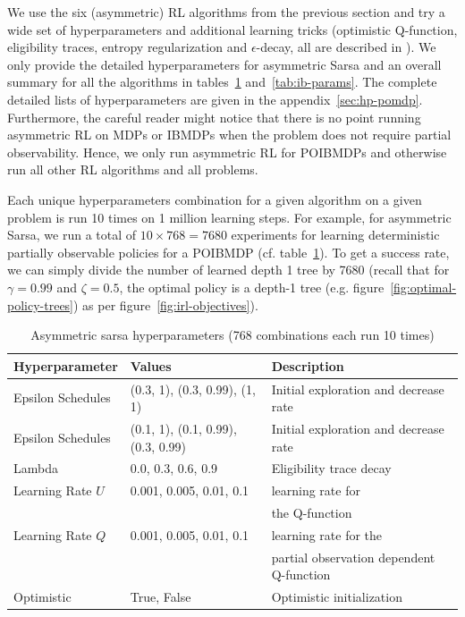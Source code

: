 We use the six (asymmetric) RL algorithms from the previous section and try a wide set of hyperparameters and additional learning tricks (optimistic Q-function, eligibility traces, entropy regularization and $\epsilon$-decay, all are described in \cite{sutton}).
We only provide the detailed hyperparameters for asymmetric Sarsa and an overall summary for all the algorithms in tables~\ref{tab:hp-sarsa} and~\ref{tab:ib-params}.
The complete detailed lists of hyperparameters are given in the appendix~\ref{sec:hp-pomdp}.
Furthermore, the careful reader might notice that there is no point running asymmetric RL on MDPs or IBMDPs when the problem does not require partial observability.
Hence, we only run asymmetric RL for POIBMDPs and otherwise run all other RL algorithms and all problems.

Each unique hyperparameters combination for a given algorithm on a given problem is run 10 times on 1 million learning steps.
For example, for asymmetric Sarsa, we run a total of $10\times 768= 7680$ experiments for learning deterministic partially observable policies for a POIBMDP (cf. table~\ref{tab:hp-sarsa}).
To get a success rate, we can simply divide the number of learned depth 1 tree by 7680 (recall that for $\gamma=0.99$ and $\zeta=0.5$, the optimal policy is a depth-1 tree (e.g. figure~\ref{fig:optimal-policy-trees}) as per figure~\ref{fig:irl-objectives}). 

\begin{table}
\centering
\small
\caption{Asymmetric sarsa hyperparameters (768 combinations each run 10 times)}\label{tab:hp-sarsa}
\begin{tabular}{lll}
\toprule
\textbf{Hyperparameter} & \textbf{Values} & \textbf{Description} \\
\midrule
Epsilon Schedules & (0.3, 1), (0.3, 0.99), (1, 1) & Initial exploration and decrease rate \\
Epsilon Schedules & (0.1, 1), (0.1, 0.99), (0.3, 0.99) & Initial exploration and decrease rate \\
Lambda & 0.0, 0.3, 0.6, 0.9 & Eligibility trace decay \\
Learning Rate $U$ & 0.001, 0.005, 0.01, 0.1 & learning rate for \\
 & & the Q-function \\
Learning Rate $Q$ & 0.001, 0.005, 0.01, 0.1 & learning rate for the \\
 & & partial observation dependent Q-function \\
Optimistic & True, False & Optimistic initialization \\
\bottomrule
\end{tabular}
\end{table}

